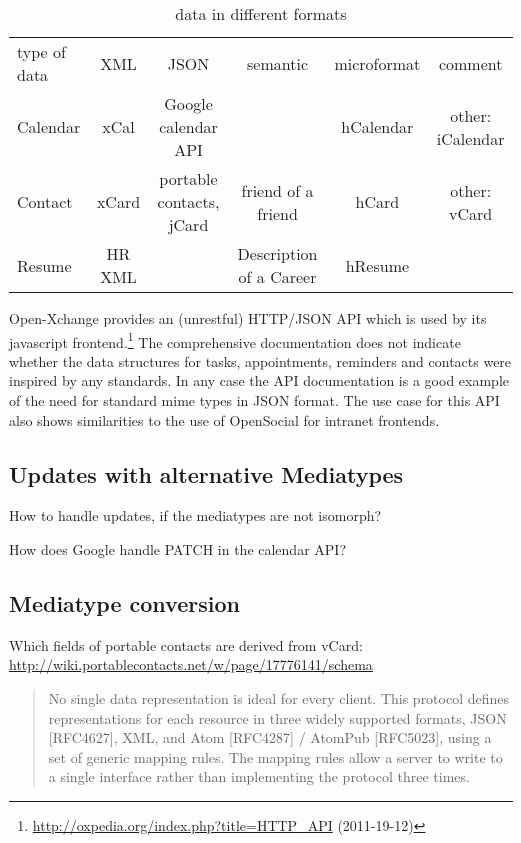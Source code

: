 \documentclass[12pt,a4paper]{scrartcl}		%
\newcommand{\citeurl}[2]{\url{#1} (#2)}
\begin{document}
\begin{table}
  \begin{tabular}{l c c c c c}
    type of data & XML  & JSON                      & semantic          & microformat & comment \\
    Calendar     & xCal & Google calendar API       &                   & hCalendar & other: iCalendar  \\
    Contact      & xCard & portable contacts, jCard & friend of a friend & hCard & other: vCard \\
    Resume       & HR XML &                          & Description of a Career & hResume & \\    
  \end{tabular}
  \caption{data in different formats}
  \label{tab:data-formats}
\end{table}

Open-Xchange provides an (unrestful) HTTP/JSON API which is used by its
javascript
frontend.\footnote{\citeurl{http://oxpedia.org/index.php?title=HTTP_API}{2011-19-12}}
The comprehensive documentation does not indicate whether the data structures
for tasks, appointments, reminders and contacts were inspired by any
standards. In any case the API documentation is a good example of the need for
standard mime types in JSON format. The use case for this API also shows
similarities to the use of OpenSocial for intranet frontends.

\subsection{Updates with alternative Mediatypes}
How to handle updates, if the mediatypes are not isomorph?

How does Google handle PATCH in the calendar API?

\subsection{Mediatype conversion}

Which fields of portable contacts are derived from vCard: \url{http://wiki.portablecontacts.net/w/page/17776141/schema}

\begin{quote}
  No single data representation is ideal for every client. This protocol defines representations for each resource in three widely supported formats, JSON [RFC4627], XML, and Atom [RFC4287] / AtomPub [RFC5023], using a set of generic mapping rules. The mapping rules allow a server to write to a single interface rather than implementing the protocol three times.
\end{quote}\cite[Core API Server]{OSSpec2.0.1}
\end{document}
